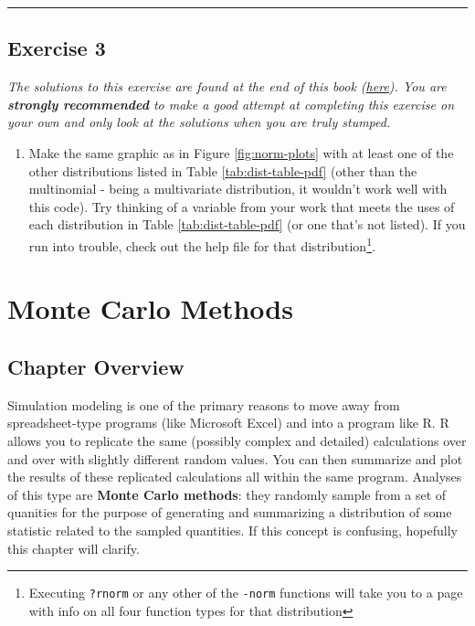 \documentclass[]{book}
\providecommand{\tightlist}{%
  \setlength{\itemsep}{0pt}\setlength{\parskip}{0pt}}
\let\rmarkdownfootnote\footnote%
\def\footnote{\protect\rmarkdownfootnote}
\theoremstyle{definition}
\theoremstyle{definition}
\theoremstyle{definition}
\theoremstyle{remark}
\begin{document}
\begin{center}\rule{0.5\linewidth}{\linethickness}\end{center}

\section*{Exercise 3}\label{exercise-3}

\emph{The solutions to this exercise are found at the end of this book
(\protect\hyperlink{ex3-answers}{here}). You are \textbf{strongly
recommended} to make a good attempt at completing this exercise on your
own and only look at the solutions when you are truly stumped.}

\begin{enumerate}
\def\labelenumi{\arabic{enumi}.}
\tightlist
\item
  Make the same graphic as in Figure \ref{fig:norm-plots} with at least
  one of the other distributions listed in Table
  \ref{tab:dist-table-pdf} (other than the multinomial - being a
  multivariate distribution, it wouldn't work well with this code). Try
  thinking of a variable from your work that meets the uses of each
  distribution in Table \ref{tab:dist-table-pdf} (or one that's not
  listed). If you run into trouble, check out the help file for that
  distribution\footnote{Executing \texttt{?rnorm} or any other of the
    \texttt{-norm} functions will take you to a page with info on all
    four function types for that distribution}.
\end{enumerate}

\chapter{Monte Carlo Methods}\label{ch4}

\section*{Chapter Overview}\label{chapter-overview-3}

Simulation modeling is one of the primary reasons to move away from
spreadsheet-type programs (like Microsoft Excel) and into a program like
R. R allows you to replicate the same (possibly complex and detailed)
calculations over and over with slightly different random values. You
can then summarize and plot the results of these replicated calculations
all within the same program. Analyses of this type are \textbf{Monte
Carlo methods}: they randomly sample from a set of quanities for the
purpose of generating and summarizing a distribution of some statistic
related to the sampled quantities. If this concept is confusing,
hopefully this chapter will clarify.
\end{document}
